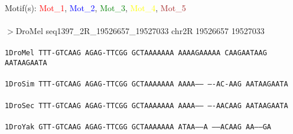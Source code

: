 \documentclass[11pt,twoside,reqno,a4paper]{article}
\begin{document}
\noindent
\newlength{\charwidth}Motif(s): \textcolor{Red}{Mot\_1}, \textcolor{Blue}{Mot\_2}, \textcolor{Green}{Mot\_3}, \textcolor{Yellow}{Mot\_4}, \textcolor{Brown}{Mot\_5}\\
\\
$>$DroMel	seq1397\_2R\_19526657\_19527033	chr2R	19526657	19527033 \\
 \\
\texttt{1\hspace*{3\charwidth}DroMel	TTT-GTCAAG	AGAG-TTCGG	GCTAAAAAAA	AAAAGAAAAA	CAAGAATAAG	AATAAGAATA	\\
\hspace*{4\charwidth}\hspace*{7\charwidth}\hspace*{1\charwidth}\hspace*{1\charwidth}\hspace*{1\charwidth}\hspace*{1\charwidth}\hspace*{1\charwidth}\hspace*{1\charwidth}\\
1\hspace*{3\charwidth}DroSim	TTT-GTCAAG	AGAG-TTCGG	GCTAAAAAAA	AAAA------	----AC-AAG	AATAAGAATA	\\
\hspace*{4\charwidth}\hspace*{7\charwidth}\hspace*{1\charwidth}\hspace*{1\charwidth}\hspace*{1\charwidth}\hspace*{1\charwidth}\hspace*{1\charwidth}\hspace*{1\charwidth}\\
1\hspace*{3\charwidth}DroSec	TTT-GTCAAG	AGAG-TTCGG	GCTAAAAAAA	AAAA------	----AACAAG	AATAAGAATA	\\
\hspace*{4\charwidth}\hspace*{7\charwidth}\hspace*{1\charwidth}\hspace*{1\charwidth}\hspace*{1\charwidth}\hspace*{1\charwidth}\hspace*{1\charwidth}\hspace*{1\charwidth}\\
1\hspace*{3\charwidth}DroYak	GTT-GTCAAG	AGAG-TTCGG	GCTAAAAAAA	ATAA-----A	-----ACAAG	AA------GA	\\
}
\end{document}
